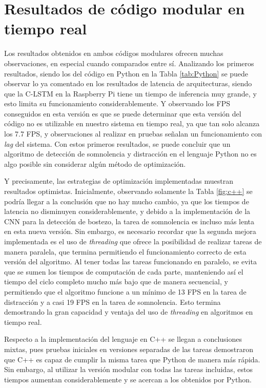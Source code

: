 \section{Resultados de código modular en tiempo real}
Los resultados obtenidos en ambos códigos modulares ofrecen muchas observaciones, en especial cuando comparados entre sí. Analizando los primeros resultados, siendo los del código en Python en la Tabla \ref{tab:Python} se puede observar lo ya comentado en los resultados de latencia de arquitecturas, siendo que la C-LSTM en la Raspberry Pi tiene un tiempo de inferencia muy grande, y esto limita su funcionamiento considerablemente. Y observando los FPS conseguidos en esta versión es que se puede determinar que esta versión del código no es utilizable en nuestro sistema en tiempo real, ya que tan solo alcanza los 7.7 FPS, y observaciones al realizar en pruebas señalan un funcionamiento con \textit{lag} del sistema. Con estos primeros resultados, se puede concluir que un algoritmo de detección de somnolencia y distracción en el lenguaje Python no es algo posible sin considerar algún método de optimización. 

Y precisamente, las estrategias de optimización implementadas muestran resultados optimistas. Inicialmente, observando solamente la Tabla \ref{fig:c++} se podría llegar a la conclusión que no hay mucho cambio, ya que los tiempos de latencia no disminuyen considerablemente, y debido a la implementación de la CNN para la detección de bostezo, la tarea de somnolencia es incluso más lenta en esta nueva versión. Sin embargo, es necesario recordar que la segunda mejora implementada es el uso de \textit{threading} que ofrece la posibilidad de realizar tareas de manera paralela, que termina permitiendo el funcionamiento correcto de esta versión del algoritmo. Al tener todas las tareas funcionando en paralelo, se evita que se sumen los tiempos de computación de cada parte, manteniendo así el tiempo del ciclo completo mucho más bajo que de manera secuencial, y permitiendo que el algoritmo funcione a un mínimo de 13 FPS en la tarea de distracción y a casi 19 FPS en la tarea de somnolencia. Esto termina demostrando la gran capacidad y ventaja del uso de \textit{threading} en algoritmos en tiempo real. 

Respecto a la implementación del lenguaje en C++ se llegan a conclusiones mixtas, pues pruebas iniciales en versiones separadas de las tareas demostraron que C++ es capaz de cumplir la misma tarea que Python de manera más rápida. Sin embargo, al utilizar la versión modular con todas las tareas incluidas, estos tiempos aumentan considerablemente y se acercan a los obtenidos por Python. 

